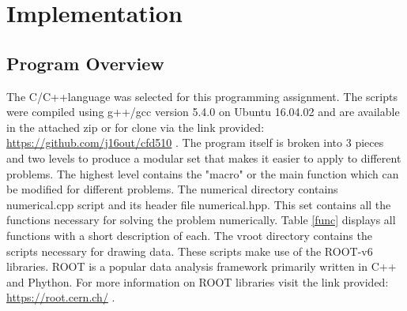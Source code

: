 \documentclass[paper=a4, fontsize=11pt, abstract=on]{scrartcl}
\numberwithin{equation}{section}		%
\numberwithin{figure}{section}			%
\numberwithin{table}{section}				%
\begin{document}
\section{Implementation}
\subsection{Program Overview}
The C/C++language was selected for this programming assignment. The scripts were compiled using g++/gcc version 5.4.0 on Ubuntu 16.04.02 and are available in the attached zip or for clone via the link provided: \url{https://github.com/j16out/cfd510} . The program itself is broken into 3 pieces and two levels to produce a modular set that makes it easier to apply to different problems. The highest level contains the "macro" or the main function which can be modified for different problems. The numerical directory contains numerical.cpp script and its header file numerical.hpp. This set contains all the functions necessary for solving the problem numerically. Table \ref{func} displays all functions with a short description of each. The vroot directory contains the scripts necessary for drawing data. These scripts make use of the ROOT-v6 libraries. ROOT is a popular data analysis framework primarily written in C++ and Phython. For more information on ROOT libraries visit the link provided: \url{https://root.cern.ch/} .
\end{document}
